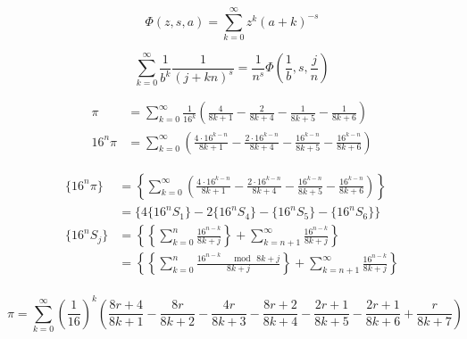 $$\Phi (z,s,a) = \sum\limits_{k = 0}^\infty {z^k} {(a + k)^{ - s}}$$

$$\sum\limits_{k = 0}^\infty {\frac{1}{b^k}\frac{1}{{(j + kn)}^s}} = \frac{1}{n^s}\Phi \left( {\frac{1}{b},s,\frac{j}{n}} \right)$$

$$\begin{aligned}
\pi &= \sum_{k = 0}^{\infty} \frac{1}{16^k} \left( \frac{4}{8k + 1} - \frac{2}{8k + 4} - \frac{1}{8k + 5} - \frac{1}{8k + 6} \right)\\
16^{n} \pi &= \sum_{k = 0}^{\infty} \left( \frac{4 \cdot 16^{k-n}}{8k + 1} - \frac{2\cdot 16^{k-n}}{8k + 4} - \frac{ 16^{k-n}}{8k + 5} - \frac{16^{k-n}}{8k + 6} \right)
\end{aligned} $$

$$\begin{aligned}
\{{16^n}\pi \} &= \left\{ {\sum\limits_{k = 0}^\infty {\left( {\frac{{4 \cdot {{16}^{k - n}}}}{8k + 1} - \frac{{2 \cdot {{16}^{k - n}}}}{8k + 4} - \frac{{16}^{k - n}}{8k + 5} - \frac{{16}^{k - n}}{8k + 6}} \right)} } \right\}\\
&= \{4\{ {16^n}{S_1}\} - 2\{ {16^n}{S_4}\} - \{ {16^n}{S_5}\} - \{ {16^n}{S_6}\} \} \\
\{{16^n}{S_j}\} &= \left\{ {\left\{ {\sum_{k = 0}^n {\frac{{16}^{n - k}}{8k + j}} } \right\} + \sum\limits_{k = n + 1}^\infty {\frac{{16}^{n - k}}{8k + j}} } \right\}\\
&= \left\{{\left\{ {\sum_{k = 0}^n {\frac{{{{16}^{n - k}}\quad \bmod \,8k + j}}{8k + j}} } \right\} + \sum_{k = n + 1}^\infty {\frac{{16}^{n - k}}{8k + j}} } \right\}\\
\end{aligned} $$

$$\pi = \sum\limits_{k = 0}^\infty {{{\left( {\frac{1}{16}} \right)}^k}} \left( {\frac{8r + 4}{8k + 1} - \frac{8r}{8k + 2} - \frac{4r}{8k + 3} - \frac{8r + 2}{8k + 4} - \frac{2r + 1}{8k + 5} - \frac{2r + 1}{8k + 6} + \frac{r}{8k + 7}} \right)$$

